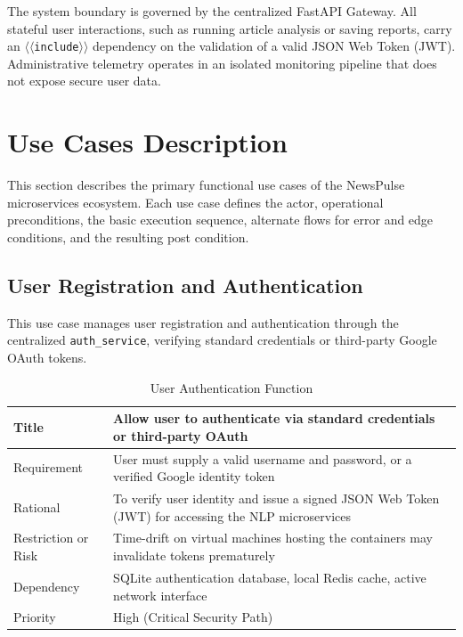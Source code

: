 The system boundary is governed by the centralized FastAPI Gateway. All stateful user interactions, such as running article analysis or saving reports, carry an \texttt{$\langle\langle$include$\rangle\rangle$} dependency on the validation of a valid JSON Web Token (JWT). Administrative telemetry operates in an isolated monitoring pipeline that does not expose secure user data.

\section{Use Cases Description}
This section describes the primary functional use cases of the NewsPulse microservices ecosystem. Each use case defines the actor, operational preconditions, the basic execution sequence, alternate flows for error and edge conditions, and the resulting post condition.

\subsection{User Registration and Authentication}
This use case manages user registration and authentication through the centralized \texttt{auth\_service}, verifying standard credentials or third-party Google OAuth tokens.

\begin{table}[h!]
    \begin{tabularx}{\textwidth}{|l|X|}
        \hline
        Title & Allow user to authenticate via standard credentials or third-party OAuth \\
        \hline
        Requirement & User must supply a valid username and password, or a verified Google identity token \\
        \hline
        Rational & To verify user identity and issue a signed JSON Web Token (JWT) for accessing the NLP microservices \\
        \hline
        Restriction or Risk & Time-drift on virtual machines hosting the containers may invalidate tokens prematurely \\
        \hline
        Dependency & SQLite authentication database, local Redis cache, active network interface \\
        \hline
        Priority & High (Critical Security Path) \\
        \hline
    \end{tabularx}
    \caption{User Authentication Function}
    \label{tab:table_user_login_function}
\end{table}


